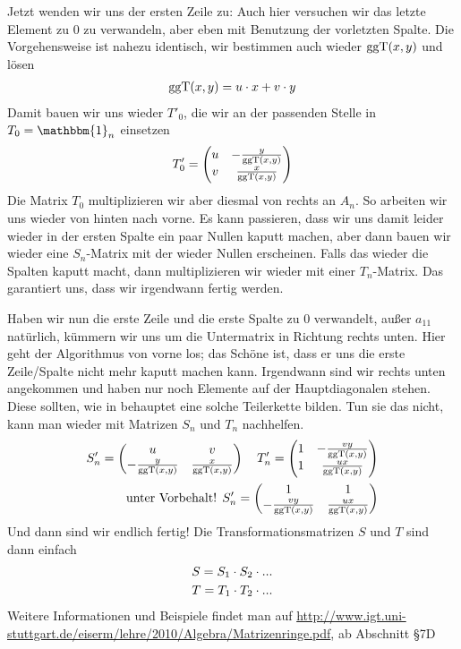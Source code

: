 \begin{*anmerkung}[Teil 2]
	Jetzt wenden wir uns der ersten Zeile zu: Auch hier versuchen wir das letzte Element zu 0 zu verwandeln, aber eben mit Benutzung der vorletzten Spalte. Die Vorgehensweise ist nahezu identisch, wir bestimmen auch wieder $\operatorname{ggT}(x,y)$ und lösen
	\begin{align}
		\operatorname{ggT}(x,y)=u\cdot x + v\cdot y\notag
	\end{align}
	Damit bauen wir uns wieder $T'_0$, die wir an der passenden Stelle in $T_0=\mathbbm{1}_n$ einsetzen
	\begin{align}
		T'_0=\begin{pmatrix}u & -\frac{y}{\operatorname{ggT}(x,y)} \\ v & \frac{x}{\operatorname{ggT}(x,y)}\end{pmatrix}\notag
	\end{align}
	Die Matrix $T_0$ multiplizieren wir aber diesmal von rechts an $A_n$. So arbeiten wir uns wieder von hinten nach vorne. Es kann passieren, dass wir uns damit leider wieder in der ersten Spalte ein paar Nullen kaputt machen, aber dann bauen wir wieder eine $S_n$-Matrix mit der wieder Nullen erscheinen. Falls das wieder die Spalten kaputt macht, dann multiplizieren wir wieder mit einer $T_n$-Matrix. Das  garantiert uns, dass wir irgendwann fertig werden.
	
	Haben wir nun die erste Zeile und die erste Spalte zu 0 verwandelt, außer $a_{11}$ natürlich, kümmern wir uns um die Untermatrix in Richtung rechts unten. Hier geht der Algorithmus von vorne los; das Schöne ist, dass er uns die erste Zeile/Spalte nicht mehr kaputt machen kann. Irgendwann sind wir rechts unten angekommen und haben nur noch Elemente auf der Hauptdiagonalen stehen. Diese sollten, wie in  behauptet eine solche Teilerkette bilden. Tun sie das nicht, kann man wieder mit Matrizen $S_n$ und $T_n$ nachhelfen.
	\begin{align}
		S'_n=\begin{pmatrix}u & v \\ -\frac{y}{\operatorname{ggT}(x,y)} & \frac{x}{\operatorname{ggT}(x,y)}\end{pmatrix}\quad 
		T'_n=\begin{pmatrix}1 & -\frac{vy}{\operatorname{ggT}(x,y)} \\ 1 & \frac{ux}{\operatorname{ggT}(x,y)}\end{pmatrix} \notag \\
		\text{unter Vorbehalt! }S'_n=\begin{pmatrix}1 & 1 \\ -\frac{vy}{\operatorname{ggT}(x,y)} & \frac{ux}{\operatorname{ggT}(x,y)}\end{pmatrix}\notag
	\end{align}
	Und dann sind wir endlich fertig! Die Transformationsmatrizen $S$ und $T$ sind dann einfach
	\begin{align}
		S = S_1\cdot S_2\cdot ... \notag \\
		T = T_1\cdot T_2\cdot ... \notag
	\end{align}
	Weitere Informationen und Beispiele findet man auf \url{http://www.igt.uni-stuttgart.de/eiserm/lehre/2010/Algebra/Matrizenringe.pdf}, ab Abschnitt §7D
\end{*anmerkung}
